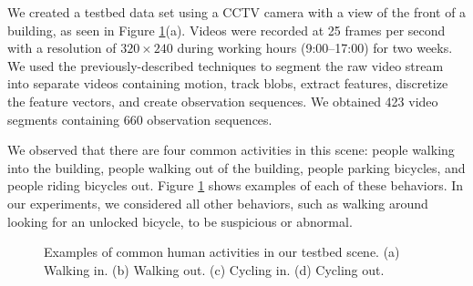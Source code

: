 We created a testbed data set using a CCTV camera with a view of the
front of a building, as seen in
Figure \ref{fig:batch-example-behavior}(a). Videos were recorded at 25
frames per second with a resolution of $320 \times 240$ during working
hours (9:00--17:00) for two weeks. We used the previously-described
techniques to segment the raw video stream into separate videos
containing motion, track blobs, extract features, discretize the
feature vectors, and create observation sequences. We obtained 423
video segments containing 660 observation sequences.

We observed that there are four common activities in this scene:
people walking into the building, people walking out of the building,
people parking bicycles, and people riding bicycles
out. Figure \ref{fig:batch-example-behavior} shows examples of
each of these behaviors. In our experiments, we considered all other
behaviors, such as walking around looking for an unlocked bicycle, to
be suspicious or abnormal.

\begin{figure}[t]
  \centering
  \hspace{0.05in}
  \hspace{0.05in}
  \hspace{0.05in}
  \caption[Examples of common human activities in our testbed
    scene.]{\small Examples of common human activities in our testbed scene.
    (a) Walking in. (b) Walking out. (c) Cycling in. (d) Cycling out.}
  \label{fig:batch-example-behavior}
\end{figure}


